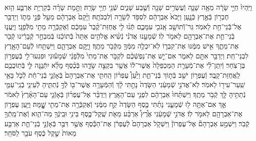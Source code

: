 \documentclass[twoside, openany, parskip=half, 11pt]{book}
\begin{document}
\begin{sometimes}
\begin{footnotesize}
\begin{multicols}{2}
\\
וַיִּֽהְיוּ֙ חַיֵּ֣י שָׂרָ֔ה מֵאָ֥ה שָׁנָ֛ה וְֿעֶשְׂרִ֥ים שָׁנָ֖ה וְֿשֶׁ֣בַע שָׁנִ֑ים שְֿׁנֵ֖י חַיֵּ֥י שָׂרָֽה׃ וַתָּ֣מָת שָׂרָ֗ה בְּֿקִרְיַ֥ת אַרְבַּ֛ע הִ֥וא חֶבְר֖וֹן בְּֿאֶ֣רֶץ כְּֿנָ֑עַן וַיָּבֹא֙ אַבְרָהָ֔ם לִסְפֹּ֥ד לְֿשָׂרָ֖ה וְֿלִבְכֹּתָֽהּ׃ וַיָּ֨קָם֙ אַבְרָהָ֔ם מֵעַ֖ל פְּֿנֵ֣י מֵת֑וֹ וַיְדַבֵּ֥ר אֶל־בְּֿֿנֵי־חֵ֖ת לֵאמֹֽר׃ גֵּר־וְֿֿתוֹשָׁ֥ב אָֽנֹכִ֖י עִמָּכֶ֑ם תְּֿנ֨וּ לִ֤י אֲחֻזַּת־קֶ֨בֶר֙ עִמָּכֶ֔ם וְֿאֶקְבְּֿרָ֥ה מֵתִ֖י מִלְּֿפָנָֽי׃ וַיַּֽעֲנ֧וּ בְֿנֵי־חֵ֛ת אֶת־אַבְרָהָ֖ם לֵאמֹ֥ר לֽוֹ׃ שְֿׁמָעֵ֣נוּ אֲדֹנִ֗י נְֿשִׂ֨יא אֱלֹהִ֤ים אַתָּה֙ בְּֿתוֹכֵ֔נוּ בְּֿמִבְחַ֣ר קְֿבָרֵ֔ינוּ קְֿבֹ֖ר אֶת־מֵתֶ֑ךָ אִ֣ישׁ מִמֶּ֔נּוּ אֶת־קִבְר֛וֹ לֹֽא־יִכְלֶ֥ה מִמְּֿךָ֖ מִקְּֿבֹ֥ר מֵתֶֽךָ׃ וַיָּ֧קָם אַבְרָהָ֛ם וַיִּשְׁתַּ֥חוּ לְֿעַם־הָאָ֖רֶץ לִבְנֵי־חֵֽת׃  וַיְדַבֵּ֥ר אִתָּ֖ם לֵאמֹ֑ר אִם־יֵ֣שׁ אֶת־נַפְשְֿׁכֶ֗ם לִקְבֹּ֤ר אֶת־מֵתִי֙ מִלְּֿפָנַ֔י שְֿׁמָע֕וּנִי וּפִגְעוּ־לִ֖י בְּֿעֶפְר֥וֹן בֶּן־צֹֽחַר׃ וְֿיִֽתֶּן־לִ֗י אֶת־מְֿעָרַ֤ת הַמַּכְפֵּלָה֙ אֲשֶׁר־ל֔וֹ אֲשֶׁ֖ר בִּקְצֵ֣ה שָׂדֵ֑הוּ בְּֿכֶ֨סֶף מָלֵ֜א יִתְּֿנֶ֥נָּה לִּ֛י בְּֿתֽוֹכֲכֶ֖ם לַֽאֲחֻזַּת־קָֽבֶר׃ וְֿעֶפְר֥וֹן יֹשֵׁ֖ב בְּֿת֣וֹךְ בְּֿנֵי־חֵ֑ת וַיַּ֩עַן֩ עֶפְר֨וֹן הַֽחִתִּ֤י אֶת־אַבְרָהָם֙ בְּֿאָזְֿנֵ֣י בְֿנֵי־חֵ֔ת לְֿכֹ֛ל בָּאֵ֥י שַֽׁעַר־עִיר֖וֹ לֵאמֹֽר׃ לֹֽא־אֲדֹנִ֣י שְֿׁמָעֵ֔נִי הַשָּׂדֶה֙ נָתַ֣תִּי לָ֔ךְ וְֿהַמְּֿעָרָ֥ה אֲשֶׁר־בּ֖וֹ לְֿךָ֣ נְֿתַתִּ֑יהָ לְֿעֵינֵ֧י בְֿנֵֽי־עַמִּ֛י נְֿתַתִּ֥יהָ לָּ֖ךְ קְֿבֹ֥ר מֵתֶֽךָ׃ וַיִּשְׁתַּ֨חוּ֙ אַבְרָהָ֔ם לִפְנֵ֖י עַם־הָאָֽרֶץ׃  וַיְדַבֵּ֨ר אֶל־עֶפְר֜וֹן בְּֿאָזְֿנֵ֤י עַם־הָאָ֨רֶץ֙ לֵאמֹ֔ר אַ֛ךְ אִם־אַתָּ֥ה ל֖וּ שְֿׁמָעֵ֑נִי נָתַ֜תִּי כֶּ֤סֶף הַשָּׂדֶה֙ קַ֣ח מִמֶּ֔נִּי וְֿאֶקְבְּֿרָ֥ה אֶת־מֵתִ֖י שׇׇׇׇׇׇׇׇָֽׁמָּה׃ וַיַּ֧עַן עֶפְר֛וֹן אֶת־אַבְרָהָ֖ם לֵאמֹ֥ר לֽוֹ׃ אֲדֹנִ֣י שְֿׁמָעֵ֔נִי אֶ֩רֶץ֩ אַרְבַּ֨ע מֵאֹ֧ת שֶֽׁקֶל־כֶּ֛סֶף בֵּינִ֥י וּבֵֽינְֿךָ֖ מַה־הִ֑וא וְֿאֶת־מֵֽתְֿךָ֖ קְֿבֹֽר׃ וַיִּשְׁמַ֣ע אַבְרָהָם֘ אֶל־עֶפְרוֹן֒ וַיִּשְׁקֹ֤ל אַבְרָהָם֙ לְֿעֶפְרֹ֔ן אֶת־הַכֶּ֕סֶף אֲשֶׁ֥ר דִּבֶּ֖ר בְּֿאָזְֿנֵ֣י בְֿנֵי־חֵ֑ת אַרְבַּ֤ע מֵאוֹת֙ שֶׁ֣קֶל כֶּ֔סֶף עֹבֵ֖ר לַסֹּחֵֽר׃


\end{multicols}
\end{footnotesize}
\end{sometimes}
\end{document}
